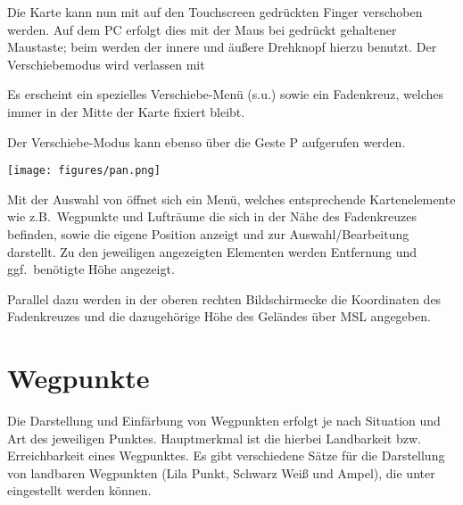 Die Karte kann nun mit auf den Touchscreen gedrückten Finger verschoben werden. Auf dem \textsf{PC}  erfolgt dies mit der Maus bei gedrückt gehaltener Maustaste; beim \al werden der innere und äußere Drehknopf hierzu benutzt. Der Verschiebemodus wird verlassen mit 

Es erscheint ein spezielles Verschiebe-Menü (s.u.) sowie ein Fadenkreuz, welches immer in der Mitte der Karte fixiert bleibt.

Der Verschiebe-Modus kann ebenso über die Geste P  aufgerufen werden.

\begin{center}
\texttt{[image: figures/pan.png]}
\end{center}
Mit der Auswahl von  öffnet sich ein Menü, welches entsprechende Kartenelemente wie z.B.\ Wegpunkte und Lufträume die sich in der Nähe des Fadenkreuzes befinden, sowie die eigene Position anzeigt und zur Auswahl/Bearbeitung darstellt. Zu den jeweiligen angezeigten Elementen werden Entfernung und ggf.\ benötigte Höhe angezeigt.

Parallel dazu werden in der oberen rechten Bildschirmecke die Koordinaten des Fadenkreuzes und die dazugehörige Höhe des Geländes über MSL angegeben.  

\section{Wegpunkte} \label{sec:waypoint-schemes}
Die Darstellung und Einfärbung von Wegpunkten erfolgt je nach Situation und Art des jeweiligen Punktes. Hauptmerkmal ist die hierbei Landbarkeit bzw. Erreichbarkeit eines Wegpunktes.  Es gibt verschiedene Sätze für die Darstellung von landbaren Wegpunkten  (Lila Punkt, Schwarz Weiß und Ampel), die unter 
 eingestellt werden können.

